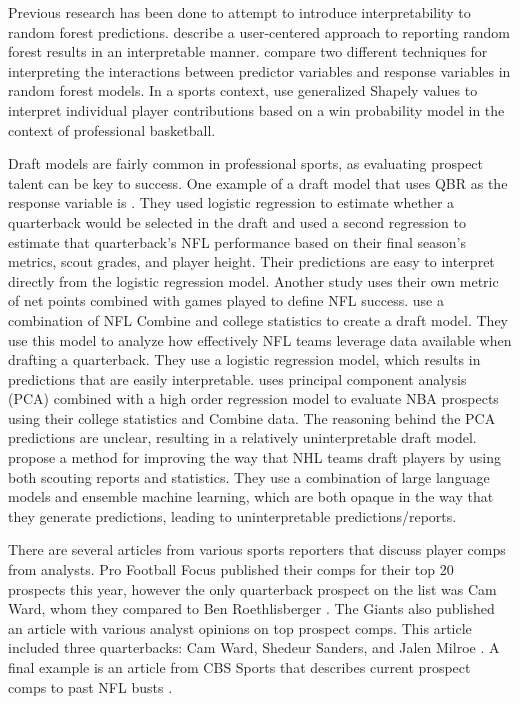 \documentclass{article}
\begin{document}
Previous research has been done to attempt to introduce interpretability to random forest predictions. \citet{petkovic_improving_2018} describe a user-centered approach to reporting random forest results in an interpretable manner. \citet{aria_comparison_2021} compare two different techniques for interpreting the interactions between predictor variables and response variables in random forest models. In a sports context, \citet{metulini_measuring_2023} use generalized Shapely values to interpret individual player contributions based on a win probability model in the context of professional basketball. 

Draft models are fairly common in professional sports, as evaluating prospect talent can be key to success. One example of a draft model that uses QBR as the response variable is \citet{craig_predicting_2021}. They used logistic regression to estimate whether a quarterback would be selected in the draft and used a second regression to estimate that quarterback's NFL performance based on their final season's metrics, scout grades, and player height. Their predictions are easy to interpret directly from the logistic regression model. Another study uses their own metric of net points combined with games played to define NFL success. \citet{wolfson_quarterback_2011} use a combination of NFL Combine and college statistics to create a draft model. They use this model to analyze how effectively NFL teams leverage data available when drafting a quarterback. They use a logistic regression model, which results in predictions that are easily interpretable. \citet{berger_jumping_2021} uses principal component analysis (PCA) combined with a high order regression model to evaluate NBA prospects using their college statistics and Combine data. The reasoning behind the PCA predictions are unclear, resulting in a relatively uninterpretable draft model. \citet{luo_improving_2024} propose a method for improving the way that NHL teams draft players by using both scouting reports and statistics. They use a combination of large language models and ensemble machine learning, which are both opaque in the way that they generate predictions, leading to uninterpretable predictions/reports.

There are several articles from various sports reporters that discuss player comps from analysts. Pro Football Focus published their comps for their top 20 prospects this year, however the only quarterback prospect on the list was Cam Ward, whom they compared to Ben Roethlisberger \citep{sikkema_2025_2025}. The Giants also published an article with various analyst opinions on top prospect comps. This article included three quarterbacks: Cam Ward, Shedeur Sanders, and Jalen Milroe \citep{noauthor_draft_2025}. A final example is an article from CBS Sports that describes current prospect comps to past NFL busts \citep{trapasso_nfl_2025}.
\end{document}
